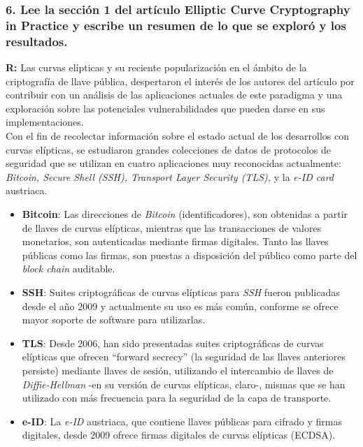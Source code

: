 \documentclass[14pt]{article}
\begin{document}
\subsubsection*{6. Lee la sección 1 del artículo Elliptic Curve Cryptography in Practice y escribe un resumen de lo que se exploró y los resultados.}
\textbf{R:} Las curvas elípticas y su reciente popularización en el ámbito de la criptografía de llave
pública, despertaron el interés de los autores del artículo por contribuir con un análisis de las
aplicaciones actuales de este paradigma y una exploración sobre las potenciales vulnerabilidades
que pueden darse en sus implementaciones.\\
Con el fin de recolectar información sobre el estado actual de los desarrollos con curvas elípticas, se estudiaron grandes colecciones de datos de protocolos de seguridad que se utilizan en cuatro aplicaciones muy reconocidas actualmente: \textit{Bitcoin, Secure Shell (SSH), Transport Layer Security (TLS),} y la \textit{e-ID card} austriaca.
\begin{itemize}
\item \textbf{Bitcoin}: Las direcciones de \textit{Bitcoin} (identificadores), son obtenidas a partir de llaves de curvas elípticas, mientras que las transacciones de valores monetarios, son autenticadas mediante firmas digitales. Tanto las llaves públicas como las firmas, son puestas a disposición del público como parte del \textit{block chain} auditable.
\item \textbf{SSH}: Suites criptográficas de curvas elípticas para \textit{SSH} fueron publicadas desde el año 2009 y actualmente su uso es más común, conforme se ofrece mayor soporte de software para utilizarlas. 
\item \textbf{TLS}: Desde 2006, han sido presentadas suites criptográficas de curvas elípticas que ofrecen ``forward secrecy'' (la seguridad de las llaves anteriores persiste) mediante llaves de sesión, utilizando el intercambio de llaves de \textit{Diffie-Hellman} -en su versión de curvas elípticas, claro-, mismas que se han utilizado con más frecuencia para la seguridad de la capa de transporte.
\item \textbf{e-ID}: La \textit{e-ID} austriaca, que contiene llaves públicas para cifrado y firmas digitales, desde 2009 ofrece firmas digitales de curvas elípticas (ECDSA).
\end{itemize}

\end{document}
